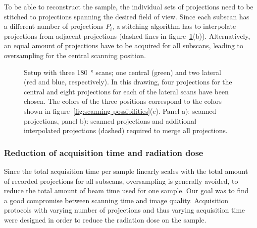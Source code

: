 To be able to reconstruct the sample, the individual sets of projections need to be stitched to projections spanning the desired field of view. Since each subscan has a different number of projections $P_{i}$, a stitching algorithm has to interpolate projections from adjacent projections (dashed lines in figure~\ref{fig:projections}(b)). Alternatively, an equal amount of projections have to be acquired for all subscans, leading to oversampling for the central scanning position.

\ifiucr
	\begin{figure}%
		\caption{Setup with three \SI{180}{\degree} scans; one central (green) and two lateral (red and blue, respectively). In this drawing, four projections for the central and eight projections for each of the lateral scans have been chosen. The colors of the three positions correspond to the colors shown in figure~\ref{fig:scanning-possibilities}(c). Panel a): scanned projections, panel b): scanned projections and additional interpolated projections (dashed) required to merge all projections.}%
		\label{fig:projections}%
	\end{figure}%
\else
	\begin{figure*}[htp]
		\centering
		\caption{Setup with three \SI{180}{\degree} scans; one central (green) and two lateral (red and blue, respectively). In this drawing, four projections for the central and eight projections for each of the lateral scans have been chosen. The colors of the three positions correspond to the colors shown in figure~\ref{fig:scanning-possibilities}(c). Panel a): scanned projections, panel b): scanned projections and additional interpolated projections (dashed) required to merge all projections.}%
		\label{fig:projections}
	\end{figure*}
\fi

\subsubsection{Reduction of acquisition time and radiation dose}
\label{subsubsec:reduction-of-acquisition-time}
Since the total acquisition time per sample linearly scales with the total amount of recorded projections for all subscans, oversampling is generally avoided, to reduce the total amount of beam time used for one sample. Our goal was to find a good compromise between scanning time and image quality. Acquisition protocols with varying number of projections and thus varying acquisition time were designed in order to reduce the radiation dose on the sample.

